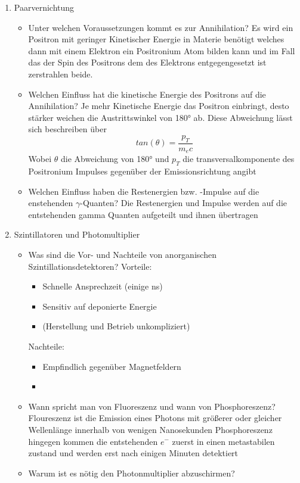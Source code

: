 \documentclass{article}
\begin{document}
\begin{enumerate}
            \item Paarvernichtung
            \begin{itemize}
                \item Unter welchen Voraussetzungen kommt es zur Annihilation?
                    Es wird ein Positron mit geringer Kinetischer Energie in Materie benötigt welches dann mit einem Elektron ein Positronium Atom bilden kann
                    und im Fall das der Spin des Positrons dem des Elektrons entgegengesetzt ist zerstrahlen beide.
                \item Welchen Einfluss hat die kinetische Energie des Positrons auf die Annihilation?
                    Je mehr Kinetische Energie das Positron einbringt, desto stärker weichen die Austrittswinkel von 180° ab. Diese Abweichung lässt sich beschreiben über
                    $$ tan(\theta) = \frac{p_T}{m_ec}$$
                    Wobei $\theta$ die Abweichung von 180° und $p_T$ die transversalkomponente des Positronium Impulses gegenüber der Emissionsrichtung angibt
                \item Welchen Einfluss haben die Restenergien bzw. -Impulse auf die enstehenden $\gamma$-Quanten?
                    Die Restenergien und Impulse werden auf die entstehenden gamma Quanten aufgeteilt und ihnen übertragen
            \end{itemize}

            \item Szintillatoren und Photomultiplier
            \begin{itemize}
                \item Was sind die Vor- und Nachteile von anorganischen Szintillationsdetektoren?
                    Vorteile:
                    \begin{itemize}
                        \item Schnelle Ansprechzeit (einige ns)
                        \item Sensitiv auf deponierte Energie
                        \item (Herstellung und Betrieb unkompliziert) 
                    \end{itemize}
                    Nachteile:
                    \begin{itemize}
                        \item Empfindlich gegenüber Magnetfeldern
                        \item 
                    \end{itemize}
                \item Wann spricht man von Fluoreszenz und wann von Phosphoreszenz?
                    Floureszenz ist die Emission eines Photons mit größerer oder gleicher Wellenlänge innerhalb von wenigen Nanosekunden \newline
                    Phosphoreszenz hingegen kommen die entstehenden $e^-$ zuerst in einen metastabilen zustand und werden erst nach einigen Minuten detektiert
                \item Warum ist es nötig den Photonmultiplier abzuschirmen?

            \end{itemize}
        \end{enumerate}
\end{document}
